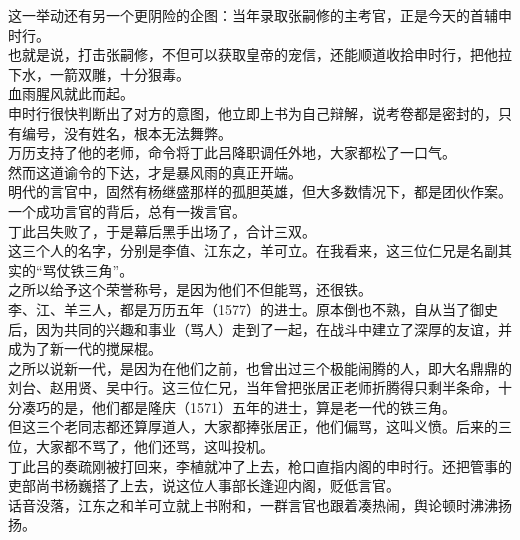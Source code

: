 \begin{multicols}{\theparacolNo}
这一举动还有另一个更阴险的企图：当年录取张嗣修的主考官，正是今天的首辅申时行。\\

也就是说，打击张嗣修，不但可以获取皇帝的宠信，还能顺道收拾申时行，把他拉下水，一箭双雕，十分狠毒。\\

血雨腥风就此而起。\\

申时行很快判断出了对方的意图，他立即上书为自己辩解，说考卷都是密封的，只有编号，没有姓名，根本无法舞弊。\\

万历支持了他的老师，命令将丁此吕降职调任外地，大家都松了一口气。\\

然而这道谕令的下达，才是暴风雨的真正开端。\\

明代的言官中，固然有杨继盛那样的孤胆英雄，但大多数情况下，都是团伙作案。一个成功言官的背后，总有一拨言官。\\

丁此吕失败了，于是幕后黑手出场了，合计三双。\\

这三个人的名字，分别是李值、江东之，羊可立。在我看来，这三位仁兄是名副其实的“骂仗铁三角”。\\

之所以给予这个荣誉称号，是因为他们不但能骂，还很铁。\\

李、江、羊三人，都是万历五年（1577）的进士。原本倒也不熟，自从当了御史后，因为共同的兴趣和事业（骂人）走到了一起，在战斗中建立了深厚的友谊，并成为了新一代的搅屎棍。\\

之所以说新一代，是因为在他们之前，也曾出过三个极能闹腾的人，即大名鼎鼎的刘台、赵用贤、吴中行。这三位仁兄，当年曾把张居正老师折腾得只剩半条命，十分凑巧的是，他们都是隆庆（1571）五年的进士，算是老一代的铁三角。\\

但这三个老同志都还算厚道人，大家都捧张居正，他们偏骂，这叫义愤。后来的三位，大家都不骂了，他们还骂，这叫投机。\\

丁此吕的奏疏刚被打回来，李植就冲了上去，枪口直指内阁的申时行。还把管事的吏部尚书杨巍搭了上去，说这位人事部长逢迎内阁，贬低言官。\\

话音没落，江东之和羊可立就上书附和，一群言官也跟着凑热闹，舆论顿时沸沸扬扬。\\


\end{multicols}
